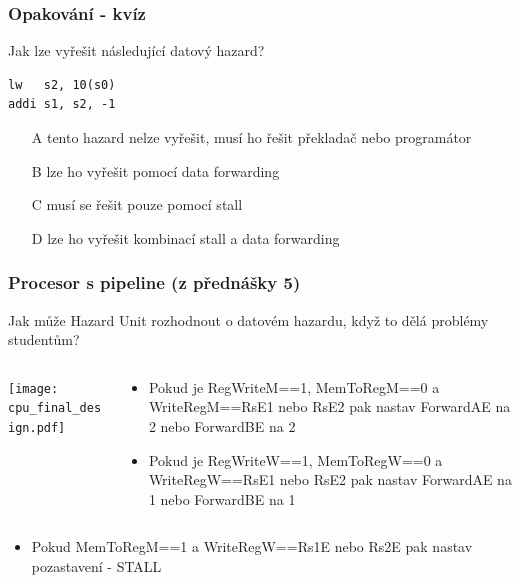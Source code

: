 \documentclass{beamer}
\begin{document}
\begin{frame}[fragile]
\frametitle{Opakování - kvíz}

Jak lze vyřešit následující datový hazard?

\begin{verbatim}
lw   s2, 10(s0)
addi s1, s2, -1 
\end{verbatim}
\bigskip
\begin{itemize}
 \item[A] tento hazard nelze vyřešit, musí ho řešit překladač nebo programátor
 \item[B] lze ho vyřešit pomocí data forwarding
 \item[C] musí se řešit pouze pomocí stall
 \item[D] lze ho vyřešit kombinací stall a data forwarding
\end{itemize}

\end{frame}


\begin{frame}

\frametitle{Procesor s pipeline (z přednášky 5)}

Jak může Hazard Unit rozhodnout o datovém hazardu, když to dělá problémy studentům?
\begin{columns}
\begin{column}{0.67\textwidth}
\texttt{[image: cpu\_final\_design.pdf]}
\end{column}
\begin{column}{0.33\textwidth}
\footnotesize
\begin{itemize}
\item Pokud je RegWriteM==1, MemToRegM==0 a WriteRegM==RsE1 nebo RsE2 pak nastav ForwardAE na 2 nebo ForwardBE na 2
\item Pokud je RegWriteW==1, MemToRegW==0 a WriteRegW==RsE1 nebo RsE2 pak nastav ForwardAE na 1 nebo ForwardBE na 1
\end{itemize}
\end{column}
\end{columns}
\bigskip
\footnotesize
\begin{itemize}
\item Pokud MemToRegM==1 a WriteRegW==Rs1E nebo Rs2E pak nastav pozastavení - STALL
\end{itemize}
\end{frame}
\end{document}
